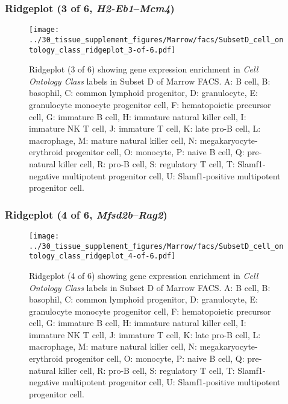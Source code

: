 \subsubsection{Ridgeplot (3 of 6, \emph{H2-Eb1}--\emph{Mcm4})}
\begin{figure}[h]
\centering
\texttt{[image: ../30\_tissue\_supplement\_figures/Marrow/facs/SubsetD\_cell\_ontology\_class\_ridgeplot\_3-of-6.pdf]}

\caption{ Ridgeplot (3 of 6)  showing gene expression enrichment in \emph{Cell Ontology Class} labels in Subset D of Marrow FACS. A: B cell, B: basophil, C: common lymphoid progenitor, D: granulocyte, E: granulocyte monocyte progenitor cell, F: hematopoietic precursor cell, G: immature B cell, H: immature natural killer cell, I: immature NK T cell, J: immature T cell, K: late pro-B cell, L: macrophage, M: mature natural killer cell, N: megakaryocyte-erythroid progenitor cell, O: monocyte, P: naive B cell, Q: pre-natural killer cell, R: pro-B cell, S: regulatory T cell, T: Slamf1-negative multipotent progenitor cell, U: Slamf1-positive multipotent progenitor cell.}
\end{figure}


\clearpage

\subsubsection{Ridgeplot (4 of 6, \emph{Mfsd2b}--\emph{Rag2})}
\begin{figure}[h]
\centering
\texttt{[image: ../30\_tissue\_supplement\_figures/Marrow/facs/SubsetD\_cell\_ontology\_class\_ridgeplot\_4-of-6.pdf]}

\caption{ Ridgeplot (4 of 6)  showing gene expression enrichment in \emph{Cell Ontology Class} labels in Subset D of Marrow FACS. A: B cell, B: basophil, C: common lymphoid progenitor, D: granulocyte, E: granulocyte monocyte progenitor cell, F: hematopoietic precursor cell, G: immature B cell, H: immature natural killer cell, I: immature NK T cell, J: immature T cell, K: late pro-B cell, L: macrophage, M: mature natural killer cell, N: megakaryocyte-erythroid progenitor cell, O: monocyte, P: naive B cell, Q: pre-natural killer cell, R: pro-B cell, S: regulatory T cell, T: Slamf1-negative multipotent progenitor cell, U: Slamf1-positive multipotent progenitor cell.}
\end{figure}


\clearpage

